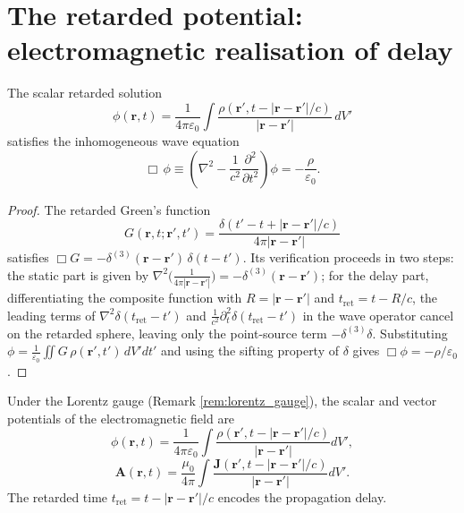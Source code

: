 \section{The retarded potential: electromagnetic realisation of delay}

\begin{lemma}\label{ch21_retarded_green}
The scalar retarded solution
\[
\phi(\mathbf{r},t) = \frac{1}{4\pi\varepsilon_0}\int \frac{\rho(\mathbf{r}', t-|\mathbf{r}-\mathbf{r}'|/c)}{|\mathbf{r}-\mathbf{r}'|}\,dV'
\]
satisfies the inhomogeneous wave equation
\[
\Box\,\phi \equiv \left(\nabla^2 - \frac{1}{c^2}\frac{\partial^2}{\partial t^2}\right)\phi = -\frac{\rho}{\varepsilon_0}.
\]
\end{lemma}

\begin{proof}
The retarded Green's function
\[
G(\mathbf{r},t;\mathbf{r}',t') = \frac{\delta(t'-t+|\mathbf{r}-\mathbf{r}'|/c)}{4\pi|\mathbf{r}-\mathbf{r}'|}
\]
satisfies $\Box G = -\delta^{(3)}(\mathbf{r}-\mathbf{r}')\,\delta(t-t')$. Its verification proceeds in two steps: the static part is given by $\nabla^2\bigl(\frac{1}{4\pi|\mathbf{r}-\mathbf{r}'|}\bigr) = -\delta^{(3)}(\mathbf{r}-\mathbf{r}')$; for the delay part, differentiating the composite function with $R=|\mathbf{r}-\mathbf{r}'|$ and $t_{\text{ret}} = t - R/c$, the leading terms of $\nabla^2\delta(t_{\text{ret}}-t')$ and $\frac{1}{c^2}\partial_t^2\delta(t_{\text{ret}}-t')$ in the wave operator cancel on the retarded sphere, leaving only the point-source term $-\delta^{(3)}\delta$. Substituting $\phi = \frac{1}{\varepsilon_0}\iint G\,\rho(\mathbf{r}',t')\,dV'dt'$ and using the sifting property of $\delta$ gives $\Box\phi = -\rho/\varepsilon_0$.
\end{proof}

\begin{theorem}\label{thm:retarded_potential}
Under the Lorentz gauge (Remark \ref{rem:lorentz_gauge}), the scalar and vector potentials of the electromagnetic field are
\[
\phi(\mathbf{r}, t) = \frac{1}{4\pi\varepsilon_0} \int \frac{\rho(\mathbf{r}', t - |\mathbf{r}-\mathbf{r}'|/c)}{|\mathbf{r}-\mathbf{r}'|} dV',
\]
\[
\mathbf{A}(\mathbf{r}, t) = \frac{\mu_0}{4\pi} \int \frac{\mathbf{J}(\mathbf{r}', t - |\mathbf{r}-\mathbf{r}'|/c)}{|\mathbf{r}-\mathbf{r}'|} dV'.
\]
The retarded time $t_{\text{ret}} = t - |\mathbf{r}-\mathbf{r}'|/c$ encodes the propagation delay.
\end{theorem}

